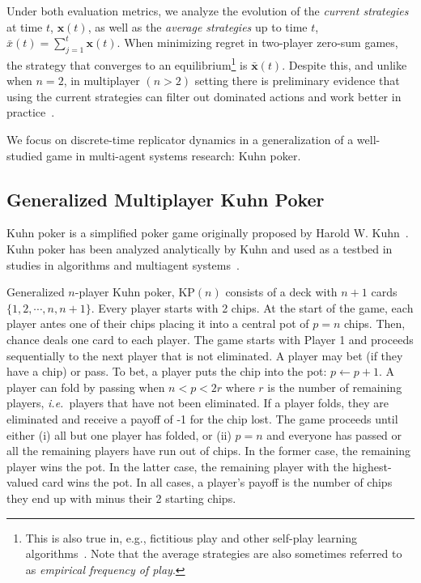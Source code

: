 \documentclass{aamas2014}
\newcommand{\bx}{\mathbf{x}}
\newcommand{\ie}{{\it i.e.}}
\begin{document}
Under both evaluation metrics, we analyze the evolution of the {\it current strategies} at time $t$, $\bx(t)$, as well 
as the {\it average strategies} up to time $t$, $\bar{x}(t) = \sum_{j=1}^t \bx(t)$. When minimizing regret in 
two-player zero-sum games, the strategy that converges to an equilibrium\footnote{This is also true in, e.g., fictitious play and other self-play learning algorithms~\cite{FudLev98}. 
Note that the average strategies are also sometimes referred to as {\it empirical frequency of play}.} is $\bar{\bx}(t)$. 
Despite this, and unlike when $n = 2$, 
in multiplayer $(n > 2)$ setting there is preliminary evidence that using the current strategies can filter out dominated actions
and work better in practice~\cite{Gibson13domination}. 

We focus on discrete-time replicator dynamics in a generalization of a well-studied game in multi-agent systems research: Kuhn poker. 

\subsection{Generalized Multiplayer Kuhn Poker}


Kuhn poker is a simplified poker game originally proposed by Harold W. Kuhn~\cite{Kuhn50}. 
Kuhn poker has been analyzed analytically by Kuhn and used as a testbed in studies in 
algorithms and multiagent systems~\cite{hoehn05,AbouRisk10,Szafron13Kuhn}.  

Generalized $n$-player Kuhn poker, KP$(n)$ consists of a deck with $n+1$ cards $\{ 1, 2, \cdots, n, n+1 \}$. 
Every player starts with 2 chips. At the start of the game, each player antes one of their chips placing it
into a central pot of $p = n$ chips. 
Then, chance deals one card to each player. 
The game starts with Player 1 and proceeds sequentially to the next player that is not eliminated. 
A player may bet (if they have a chip) or pass. 
To bet, a player puts the chip into the pot: $p \leftarrow p + 1$. 
A player can fold by passing when $n < p < 2r$ where $r$ is the number of remaining players, \ie~players that have not been eliminated. 
If a player folds, they are eliminated and receive a payoff of -1 for the chip lost. 
The game proceeds until either (i) all but one player has folded, or (ii) $p = n$ and everyone has passed or all the 
remaining players have run out of chips. 
In the former case, the remaining player wins the pot. In the latter case, the 
remaining player with the highest-valued card wins the pot. In all cases, a player's payoff is the number of chips
they end up with minus their 2 starting chips. 
\end{document}
